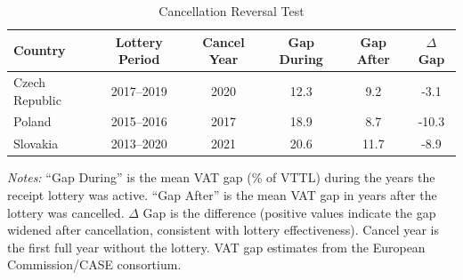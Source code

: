 \begin{table}[htbp]
\centering
\caption{Cancellation Reversal Test}
\label{tab:cancel}
\begin{threeparttable}
\begin{tabular}{lccccc}
\hline\hline
Country & Lottery Period & Cancel Year & Gap During & Gap After & $\Delta$ Gap \\
\hline
Czech Republic & 2017--2019 & 2020 & 12.3 & 9.2 & -3.1 \\
Poland & 2015--2016 & 2017 & 18.9 & 8.7 & -10.3 \\
Slovakia & 2013--2020 & 2021 & 20.6 & 11.7 & -8.9 \\
\hline\hline
\end{tabular}
\begin{tablenotes}[flushleft]
\small
\item \textit{Notes:} ``Gap During'' is the mean VAT gap (\% of VTTL) during the years the receipt lottery was active. ``Gap After'' is the mean VAT gap in years after the lottery was cancelled. $\Delta$ Gap is the difference (positive values indicate the gap widened after cancellation, consistent with lottery effectiveness). Cancel year is the first full year without the lottery. VAT gap estimates from the European Commission/CASE consortium.
\end{tablenotes}
\end{threeparttable}
\end{table}


